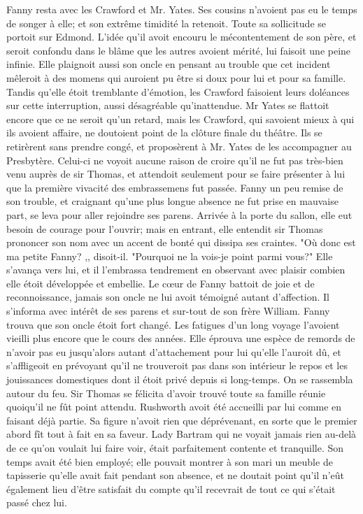 Fanny resta avec les Crawford et Mr. Yates.\setcounter{page}{131} Ses cousins n'avoient pas eu le temps de songer à elle; et son extrême timidité la retenoit. Toute sa sollicitude se portoit sur Edmond. L'idée qu'il avoit encouru le mécontentement de son père, et seroit confondu dans le blâme que les autres avoient mérité, lui faisoit une peine infinie. Elle plaignoit aussi son oncle en pensant au trouble que cet incident mêleroit à des momens qui auroient pu être si doux pour lui et pour sa famille. Tandis qu'elle étoit tremblante d'émotion, les Crawford faisoient leurs doléances sur cette interruption, aussi désagréable qu'inattendue. Mr Yates se flattoit encore que ce ne seroit qu'un retard, mais les Crawford, qui savoient mieux à qui ils avoient affaire, ne doutoient point de la clôture finale du théâtre. Ils se retirèrent sans prendre congé, et proposèrent à Mr. Yates de les accompagner au Presbytère. Celui-ci ne voyoit aucune raison de croire qu'il ne fut pas très-bien venu auprès de sir Thomas, et attendoit seulement pour se faire présenter à lui que la première vivacité des embrassemens fut passée. Fanny un peu remise de son trouble, et craignant qu'une plus longue absence ne fut prise en mauvaise part, se leva pour\setcounter{page}{132} aller rejoindre ses parens. Arrivée à la porte du sallon, elle eut besoin de courage pour l'ouvrir; mais en entrant, elle entendit sir Thomas prononcer son nom avec un accent de bonté qui dissipa ses craintes. "Où donc est ma petite Fanny? ,, disoit-il. "Pourquoi ne la vois-je point parmi vous?" Elle s'avança vers lui, et il l'embrassa tendrement en observant avec plaisir combien elle étoit développée et embellie. Le cœur de Fanny battoit de joie et de reconnoissance, jamais son oncle ne lui avoit témoigné autant d'affection. Il s'informa avec intérêt de ses parens et sur-tout de son frère William. Fanny trouva que son oncle étoit fort changé. Les fatigues d'un long voyage l'avoient vieilli plus encore que le cours des années. Elle éprouva une espèce de remords de n'avoir pas eu jusqu'alors autant d'attachement pour lui qu'elle l'auroit dû, et s'affligeoit en prévoyant qu'il ne trouveroit pas dans son intérieur le repos et les jouissances domestiques dont il étoit privé depuis si long-temps. On se rassembla autour du feu. Sir Thomas se félicita d'avoir trouvé toute sa famille réunie quoiqu'il ne fût point attendu. Rushworth avoit été accueilli par lui comme en faisant déjà partie. Sa figure n'avoit rien que\setcounter{page}{133} déprévenant, en sorte que le premier abord fît tout à fait en sa faveur. Lady Bartram qui ne voyait jamais rien au-delà de ce qu'on voulait lui faire voir, était parfaitement contente et tranquille. Son temps avait été bien employé; elle pouvait montrer à son mari un meuble de tapisserie qu'elle avait fait pendant son absence, et ne doutait point qu'il n'eût également lieu d'être satisfait du compte qu'il recevrait de tout ce qui s'était passé chez lui.
